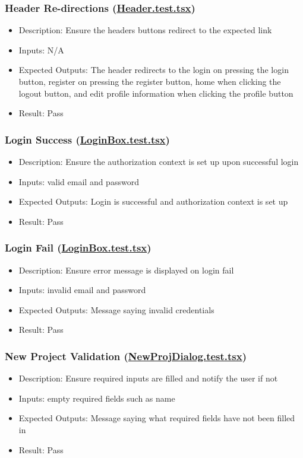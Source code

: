 \documentclass[12pt, titlepage]{article}
\begin{document}
\subsubsection{Header Re-directions (\href{https://github.com/OKKM-insights/frontend/blob/main/tests/__tests__/Header.test.tsx}{Header.test.tsx})}
\begin{itemize}
    \item Description: Ensure the headers buttons redirect to the expected link
    \item Inputs: N/A
    \item Expected Outputs: The header redirects to the login on pressing the login button, register on pressing the register button, home when clicking the logout button, and edit profile information when clicking the profile button 
    \item Result: Pass
\end{itemize}
\subsubsection{Login Success (\href{https://github.com/OKKM-insights/frontend/blob/main/tests/__tests__/LoginBox.test.tsx}{LoginBox.test.tsx})}
\begin{itemize}
    \item Description: Ensure the authorization context is set up upon successful login
    \item Inputs: valid email and password
    \item Expected Outputs: Login is successful and authorization context is set up
    \item Result: Pass
\end{itemize}
\subsubsection{Login Fail (\href{https://github.com/OKKM-insights/frontend/blob/main/tests/__tests__/LoginBox.test.tsx}{LoginBox.test.tsx})}
\begin{itemize}
    \item Description: Ensure error message is displayed on login fail
    \item Inputs: invalid email and password
    \item Expected Outputs: Message saying invalid credentials
    \item Result: Pass
\end{itemize}
\subsubsection{New Project Validation (\href{https://github.com/OKKM-insights/frontend/blob/main/tests/__tests__/NewProjDialog.test.tsx}{NewProjDialog.test.tsx})}
\begin{itemize}
    \item Description: Ensure required inputs are filled and notify the user if not
    \item Inputs: empty required fields such as name
    \item Expected Outputs: Message saying what required fields have not been filled in
    \item Result: Pass
\end{itemize}
\end{document}
